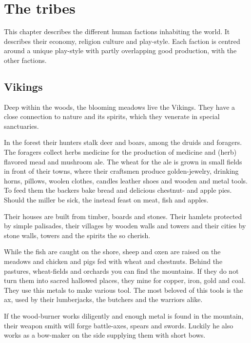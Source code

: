 \documentclass[a4paper]{book}
\title{\Title}
\author{\Author}
\begin{document}
\maketitle

\tableofcontents

\chapter{The tribes}
This chapter describes the different human factions inhabiting the world.
It describes their economy, religion culture and play-style.
Each faction is centred around a unique play-style with partly overlapping good production,
with the other factions.

\section{\Gls{Vikings}}

	Deep within the woods, the blooming meadows live the \gls{Vikings}.
	They have a close connection to nature and its spirits,
	which they venerate in special sanctuaries.

	In the forest their hunters stalk deer and boars,
	among the druids and foragers.
	The foragers collect herbs medicine for the production
	of medicine and (herb) flavored mead and mushroom ale.
	The wheat for the ale is grown in small fields in front of their towns,
	where their craftsmen produce golden-jewelry, drinking horns, pillows,
	woolen clothes, candles leather shoes and wooden and metal tools.
	To feed them the backers bake bread and delicious chestnut- and apple pies.
	Should the miller be sick, the instead feast on meat, fish and apples.

	Their houses are built from timber, boards and stones.
	Their hamlets protected by simple palisades,
	their villages by wooden walls and towers and their cities by stone walls, towers
	and the spirits the so cherish.

	While the fish are caught on the shore, sheep and oxen
	are raised on the meadows and chicken and pigs fed with wheat and chestnuts.
	Behind the pastures, wheat-fields and orchards you can find the mountains.
	If they do not turn them into sacred hallowed places,
	they mine for copper, iron, gold and coal.
	They use this metals to make various tool.
	The most beloved of this tools is the ax, used by their lumberjacks,
	the butchers and the warriors alike.

	If the wood-burner works diligently and enough metal is found in the mountain,
	their weapon smith will forge battle-axes, spears and swords.
	Luckily he also works as a bow-maker on the side supplying them with short bows.
\end{document}
